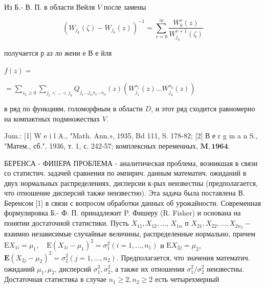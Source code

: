 \documentclass[10pt]{article}
\begin{document}
Из Б.- В. П. в области Вейля $V$ после замены



\[

\left(W_{j_{k}}(\zeta)-W_{j_{k}}(z)\right)^{-1}=\sum_{v=0}^{\infty} \frac{W_{k}^{v}(z)}{W_{j_{k}}^{v+1}(\zeta)}

\]



получается р аз ло жени е В е йля



$f(z)=$



$=\sum_{s_{k} \geqslant 0} \sum_{j_{1}<\ldots<j_{k}} Q_{j_{1} \ldots j_{n} s_{1} \ldots s_{n}}(z)\left(W_{j_{1}}^{s_{1}}(z) \ldots W_{j_{k}}^{s_{k}}(z)\right)$



в ряд по функциям, голоморфным в области $D$, и этот ряд сходится равномерно на компактных подмножествах $V$.



Jum.: [1] W e i l A., "Math. Ann.», 1935, Bd 111, S. 178-82; [2] В е r g m a n S., "Матем., сб.", 1936, т. 1, с. 242-57; комплексных переменных, $\dot{\mathbf{M}}, \mathbf{1 9 6 4}$.



БЕРЕНСА - ФИІІЕРА ПРОБЛЕМА - аналитическая проблема, возникшая в связи со статистич. задачей сравнения по әмпирич. данным математич. ожиданий в двух нормальных распределениях, дисперсии к-рых неизвестны (предполагается, что отношение дисперсий также неизвестно). Эта задача была поставлена В. Беренсом [1] в связи с вопросом обработки данных об урожайности. Современная формулировка Б.- Ф. П. принадлежит P. Фишеру (R. Fisher) и основана на понятии достаточной статистики. Пусть $X_{11}, X_{12}, \ldots$, $X_{1 n}$ п $X_{21}, X_{22}, \ldots, X_{2 n_{2}}-$ взаимно независимые случайные величины, распределенные нормально, причем $\mathrm{E} X_{1 i}=\mu_{1}, \quad \mathrm{E}\left(X_{1 i}-\mu_{1}\right)^{2}=\sigma_{1}^{2}\left(i=1, \ldots, n_{1}\right)$ и $\mathrm{E} X_{2 j}=\mu_{2}$, $\mathbf{E}\left(X_{2 j}-\mu_{2}\right)^{2}=\sigma_{2}^{2}\left(j=1, \ldots, n_{2}\right)$. Предполагается, что значения математич. ожиданий $\mu_{1}, \mu_{2}$, дисперсий $\sigma_{1}^{2}, \sigma_{2}^{2}$, а также их отношения $\sigma_{1}^{2} / \sigma_{2}^{2}$ неизвестны. Достаточная статистика в случае $n_{1} \geqslant 2, n_{2} \geqslant 2$ есть четырехмерный
\end{document}
